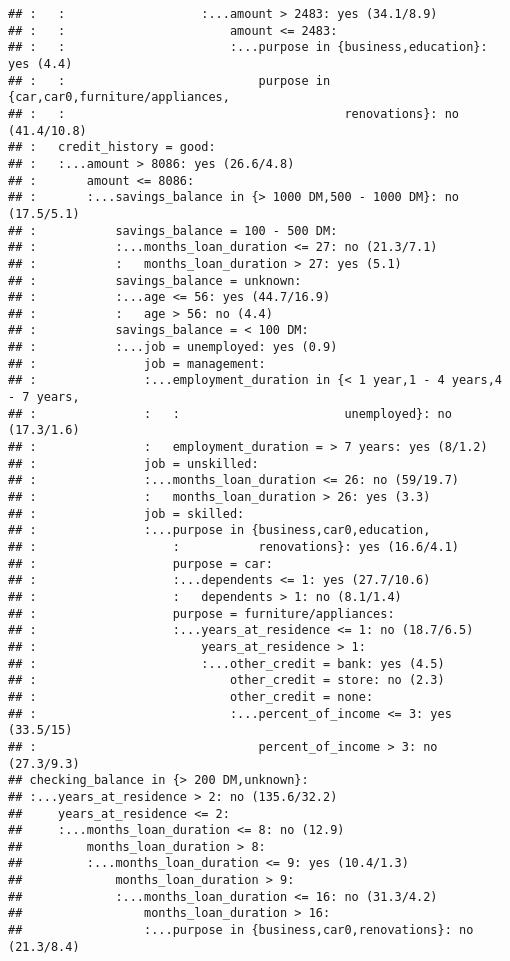 \documentclass[
]{article}
\begin{document}
\begin{verbatim}
## :   :                   :...amount > 2483: yes (34.1/8.9)
## :   :                       amount <= 2483:
## :   :                       :...purpose in {business,education}: yes (4.4)
## :   :                           purpose in {car,car0,furniture/appliances,
## :   :                                       renovations}: no (41.4/10.8)
## :   credit_history = good:
## :   :...amount > 8086: yes (26.6/4.8)
## :       amount <= 8086:
## :       :...savings_balance in {> 1000 DM,500 - 1000 DM}: no (17.5/5.1)
## :           savings_balance = 100 - 500 DM:
## :           :...months_loan_duration <= 27: no (21.3/7.1)
## :           :   months_loan_duration > 27: yes (5.1)
## :           savings_balance = unknown:
## :           :...age <= 56: yes (44.7/16.9)
## :           :   age > 56: no (4.4)
## :           savings_balance = < 100 DM:
## :           :...job = unemployed: yes (0.9)
## :               job = management:
## :               :...employment_duration in {< 1 year,1 - 4 years,4 - 7 years,
## :               :   :                       unemployed}: no (17.3/1.6)
## :               :   employment_duration = > 7 years: yes (8/1.2)
## :               job = unskilled:
## :               :...months_loan_duration <= 26: no (59/19.7)
## :               :   months_loan_duration > 26: yes (3.3)
## :               job = skilled:
## :               :...purpose in {business,car0,education,
## :                   :           renovations}: yes (16.6/4.1)
## :                   purpose = car:
## :                   :...dependents <= 1: yes (27.7/10.6)
## :                   :   dependents > 1: no (8.1/1.4)
## :                   purpose = furniture/appliances:
## :                   :...years_at_residence <= 1: no (18.7/6.5)
## :                       years_at_residence > 1:
## :                       :...other_credit = bank: yes (4.5)
## :                           other_credit = store: no (2.3)
## :                           other_credit = none:
## :                           :...percent_of_income <= 3: yes (33.5/15)
## :                               percent_of_income > 3: no (27.3/9.3)
## checking_balance in {> 200 DM,unknown}:
## :...years_at_residence > 2: no (135.6/32.2)
##     years_at_residence <= 2:
##     :...months_loan_duration <= 8: no (12.9)
##         months_loan_duration > 8:
##         :...months_loan_duration <= 9: yes (10.4/1.3)
##             months_loan_duration > 9:
##             :...months_loan_duration <= 16: no (31.3/4.2)
##                 months_loan_duration > 16:
##                 :...purpose in {business,car0,renovations}: no (21.3/8.4)

\end{verbatim}
\end{document}
